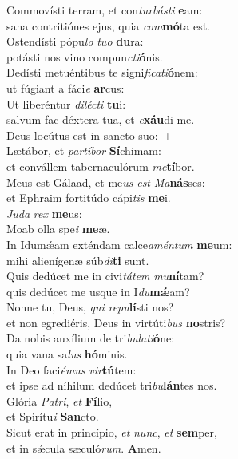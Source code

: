 \evenverse Commovísti terram, et con\textit{tur}\textit{bá}\textit{sti} \textbf{e}am:~\*\\
\evenverse sana contritiónes ejus, quia \textit{com}\textbf{mó}ta est.\\
\oddverse Ostendísti pópu\textit{lo} \textit{tu}\textit{o} \textbf{du}ra:~\*\\
\oddverse potásti nos vino compun\textit{cti}\textbf{ó}nis.\\
\evenverse Dedísti metuéntibus te signi\textit{fi}\textit{ca}\textit{ti}\textbf{ó}nem:~\*\\
\evenverse ut fúgiant a fáci\textit{e} \textbf{ar}cus:\\
\oddverse Ut liberéntur \textit{di}\textit{lé}\textit{cti} \textbf{tu}i:~\*\\
\oddverse salvum fac déxtera tua, et \textit{e}\textbf{xáu}di me.\\
\evenverse Deus locútus est in sancto suo:~+\\
\evenverse  Lætábor, et \textit{par}\textit{tí}\textit{bor} \textbf{Sí}chimam:~\*\\
\evenverse et convállem tabernaculórum \textit{me}\textbf{tí}bor.\\
\oddverse Meus est Gálaad, et me\textit{us} \textit{est} \textit{Ma}\textbf{nás}ses:~\*\\
\oddverse et Ephraim fortitúdo cápi\textit{tis} \textbf{me}i.\\
\evenverse \textit{Ju}\textit{da} \textit{rex} \textbf{me}us:~\*\\
\evenverse Moab olla spe\textit{i} \textbf{me}æ.\\
\oddverse In Idumǽam exténdam calce\textit{a}\textit{mén}\textit{tum} \textbf{me}um:~\*\\
\oddverse mihi alienígenæ súb\textit{di}\textbf{ti} sunt.\\
\evenverse Quis dedúcet me in civi\textit{tá}\textit{tem} \textit{mu}\textbf{ní}tam?~\*\\
\evenverse quis dedúcet me usque in I\textit{du}\textbf{mǽ}am?\\
\oddverse Nonne tu, Deus, \textit{qui} \textit{re}\textit{pu}\textbf{lí}sti nos?~\*\\
\oddverse et non egrediéris, Deus in virtúti\textit{bus} \textbf{no}stris?\\
\evenverse Da nobis auxílium de tri\textit{bu}\textit{la}\textit{ti}\textbf{ó}ne:~\*\\
\evenverse quia vana sa\textit{lus} \textbf{hó}minis.\\
\oddverse In Deo faci\textit{é}\textit{mus} \textit{vir}\textbf{tú}tem:~\*\\
\oddverse et ipse ad níhilum dedúcet tri\textit{bu}\textbf{lán}tes nos.\\
\evenverse Glória \textit{Pa}\textit{tri}, \textit{et} \textbf{Fí}lio,~\*\\
\evenverse et Spirítu\textit{i} \textbf{San}cto.\\
\oddverse Sicut erat in princípio, \textit{et} \textit{nunc}, \textit{et} \textbf{sem}per,~\*\\
\oddverse et in sǽcula sæculó\textit{rum}. \textbf{A}men.\\
